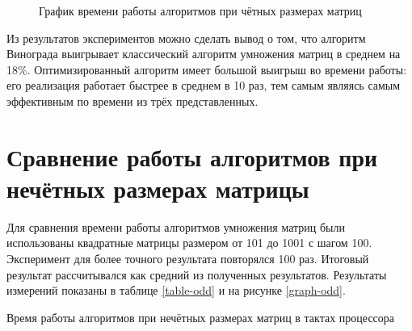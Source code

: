 \documentclass[12pt, a4paper]{report}
\begin{document}
	\begin{figure}[ht!]
		\caption{График времени работы алгоритмов при чётных размерах матриц}
		\label{graph-even}
	\end{figure}

	\newpage
	
	Из результатов экспериментов можно сделать вывод о том, что алгоритм Винограда выигрывает классический алгоритм умножения матриц в среднем на 18\%. Оптимизированный алгоритм имеет большой выигрыш во времени работы: его реализация работает быстрее в среднем в 10 раз, тем самым являясь самым эффективным по времени из трёх представленных.
	
	\section{Сравнение работы алгоритмов при нечётных размерах матрицы}
	Для сравнения времени работы алгоритмов умножения матриц были использованы квадратные матрицы размером от 101 до 1001 с шагом 100. Эксперимент для более точного результата повторялся 100 раз. Итоговый результат рассчитывался как средний из полученных результатов. Результаты измерений показаны в таблице \ref{table-odd} и на рисунке \ref{graph-odd}.\\
	
	\begin{table}[ht!]
		\caption{Время работы алгоритмов при нечётных размерах матриц в тактах процессора}
		\label{table-odd}
		\begin{center}
		\end{center}
	\end{table}
\end{document}
